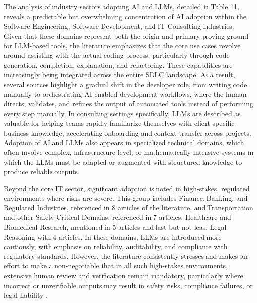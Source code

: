 The analysis of industry sectors adopting AI and LLMs, detailed in Table 11, reveals a predictable but overwhelming concentration of AI adoption within the Software Engineering, Software Development, and IT Consulting industries. Given that these domains represent both the origin and primary proving ground for LLM-based tools, the literature emphasizes that the core use cases revolve around assisting with the actual coding process, particularly through code generation, completion, explanation, and refactoring. These capabilities are increasingly being integrated across the entire SDLC landscape. As a result, several sources highlight a gradual shift in the developer role, from writing code manually to orchestrating AI-enabled development workflows, where the human directs, validates, and refines the output of automated tools instead of performing every step manually. In consulting settings specifically, LLMs are described as valuable for helping teams rapidly familiarize themselves with client-specific business knowledge, accelerating onboarding and context transfer across projects. \cite{Jensen:2025me, Zhang:2025ea, Kim:2025ao} Adoption of AI and LLMs also appears in specialized technical domains, which often involve complex, infrastructure-level, or mathematically intensive systems in which the LLMs must be adapted or augmented with structured knowledge to produce reliable outputs. \cite{Wang:2025rs, Hou:2025cl, Ahmed:2025ai, Kim:2025ao, AlHashimi:2025er}

Beyond the core IT sector, significant adoption is noted in high-stakes, regulated environments where risks are severe. This group includes Finance, Banking, and Regulated Industries, referenced in 8 articles of the literature, and Transportation and other Safety-Critical Domains, referenced in 7 articles, Healthcare and Biomedical Research, mentioned in 5 articles and last but not least Legal Reasoning with 4 articles. In these domains, LLMs are introduced more cautiously, with emphasis on reliability, auditability, and compliance with regulatory standards.  However, the literature consistently stresses and makes an effort to make a non-negotiable that in all such high-stakes environments, extensive human review and verification remain mandatory, particularly where incorrect or unverifiable outputs may result in safety risks, compliance failures, or legal liability \cite{Moore:2025vc, Ahmed:2025ai, Jabrw:2025ss, Kim:2025ao, Qiu:2025ft}. 


